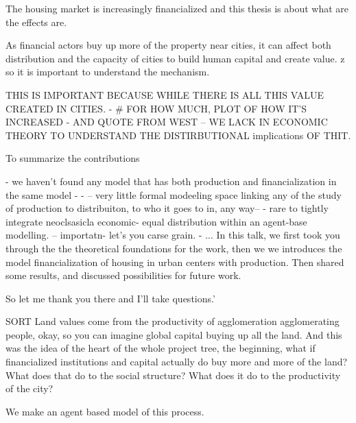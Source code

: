 \documentclass[]{article}
\begin{document}
The housing market is increasingly financialized and this thesis is about what are the effects are. 

As financial actors buy up more of the property near cities, it can affect both distribution and the capacity of cities to build human capital and create value. z
so it is important to understand the mechanism.

THIS IS IMPORTANT BECAUSE WHILE THERE IS ALL THIS VALUE CREATED IN CITIES. - # FOR HOW MUCH, PLOT OF HOW IT'S INCREASED - AND QUOTE FROM WEST -- WE LACK IN ECONOMIC THEORY TO UNDERSTAND THE DISTIRBUTIONAL implications OF THIT.

To summarize the contributions

- we haven't found any model that has both production and financialization in the same model - 
- -- very little formal modeeling space linking any of the study of production to distribuiton, to who it goes to in, any way-- 
- rare to tightly integrate neoclsasicla economic- equal distribution within an agent-base modelling. -- importatn- let's you carse grain.
- ...
In this talk, we first took you through the the theoretical foundations for the work, then we we introduces the model financialization of housing in urban centers with production. Then shared some results, and  discussed possibilities for future work. 

So let me thank you there and I'll take questions.'



SORT 
Land values come from the productivity of agglomeration agglomerating people, okay, so you can imagine global capital buying up all the land.
And this was the idea of the heart of the whole project tree, the beginning, what if financialized institutions and capital actually do buy more and more of the land? What does that do to the social structure? What does it do to the productivity of the city?

We make an agent based model of this process. 
\end{document}
